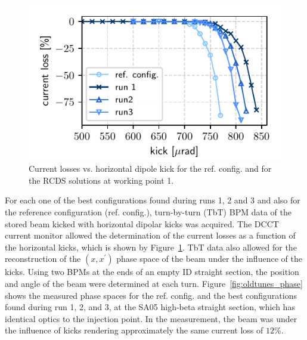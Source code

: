 \documentclass[a4paper,
               keeplastbox,   %
               ]{jacow}
\begin{document}
\begin{figure}[!h]
   \includegraphics[width=\columnwidth]{WEPL087_f1.pdf}
   \caption{Current losses vs. horizontal dipole kick for the ref. config. and for the RCDS solutions at working point 1.}
   \label{fig:loss_kicks}
\end{figure}
For each one of the best configurations found during runs 1, 2 and 3 and also for the reference configuration (ref. config.), turn-by-turn (TbT) BPM data of the stored beam kicked with horizontal dipolar kicks was acquired. The DCCT current monitor allowed the determination of the current losses as a function of the horizontal kicks, which is shown by Figure~\ref{fig:loss_kicks}. 
TbT data also allowed for the reconstruction of the $(x,x^\prime)$ phase space of the beam under the influence of the kicks. Using two BPMs at the ends of an empty ID straight section, the position and angle of the beam were determined at each turn. 
Figure~\ref{fig:oldtunes_phase} shows the measured phase spaces for the ref. config. and the best configurations found during run 1, 2, and 3, at the SA05 high-beta straight section, which has identical optics to the injection point. In the measurement, the beam was under the influence of kicks rendering approximately the same current loss of $12\%$.
\end{document}
